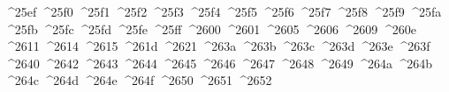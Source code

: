{  ^^^^25ef%
  ^^^^25f0%
  ^^^^25f1%
  ^^^^25f2%
  ^^^^25f3%
  ^^^^25f4%
  ^^^^25f5%
  ^^^^25f6%
  ^^^^25f7%
  ^^^^25f8%
  ^^^^25f9%
  ^^^^25fa%
  ^^^^25fb%
  ^^^^25fc%
  ^^^^25fd%
  ^^^^25fe%
  ^^^^25ff%
  ^^^^2600%
  ^^^^2601%
  ^^^^2605%
  ^^^^2606%
  ^^^^2609%
  ^^^^260e%
  ^^^^2611%
  ^^^^2614%
  ^^^^2615%
  ^^^^261d%
  ^^^^2621%
  ^^^^263a%
  ^^^^263b%
  ^^^^263c%
  ^^^^263d%
  ^^^^263e%
  ^^^^263f%
  ^^^^2640%
  ^^^^2642%
  ^^^^2643%
  ^^^^2644%
  ^^^^2645%
  ^^^^2646%
  ^^^^2647%
  ^^^^2648%
  ^^^^2649%
  ^^^^264a%
  ^^^^264b%
  ^^^^264c%
  ^^^^264d%
  ^^^^264e%
  ^^^^264f%
  ^^^^2650%
  ^^^^2651%
  ^^^^2652%
}
